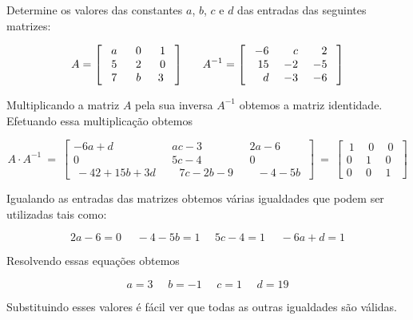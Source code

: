 \begin{problem} 
Determine os valores das constantes $a$, $b$, $c$ e $d$ das entradas das seguintes matrizes:

$$A = \left[\begin{array}{ccc}
\ a\  & \  0\  & \ 1 \ \\
5   &  2   &  0  \\
7   &  b   &  3  \ \end{array}\right]   \ \ \ \ \ \ \\
A^{-1} = \left[\begin{array}{rrr}
\ -6   &    c   &    2 \   \\
  15   & \  -2  & \ -5 \   \\
  d    &   -3   &   -6 \   \end{array}\right]$$
\end{problem}
\begin{solution} 
Multiplicando a matriz $A$ pela sua inversa $A^{-1}$ obtemos a matriz identidade.
Efetuando essa multiplicação obtemos

$$A \cdot A^{-1}\ =\ \left[\begin{array}{ccc}
-6a+d        &    ac-3      &    2a-6       \\
   0         &    5c-4      &    0          \\
\ -42+15b+3d  \ \  \ & \  \ \   7c-2b-9 \ \ \ &\  \ \   -4-5b \ \end{array}\right]\ =\ 
\left[\begin{array}{ccc}
\ 1\  &  \ 0\  & \ 0 \ \\
  0   &    1   &   0  \\
  0   &    0   &   1  \ \end{array}\right]$$

Igualando as entradas das matrizes obtemos várias igualdades que podem ser utilizadas tais como:

$$2a-6=0 \ \ \ \ \ \ -4-5b=1 \ \ \ \ \ \ 5c-4=1  \ \ \ \ \ \ -6a+d=1$$

Resolvendo essas equações obtemos

$$a=3\  \ \ \ \ \ b=-1 \ \ \ \ \ \ c=1 \ \ \ \ \ \ d=19 $$

Substituindo esses valores é fácil ver que todas as outras igualdades são válidas.
\end{solution}

